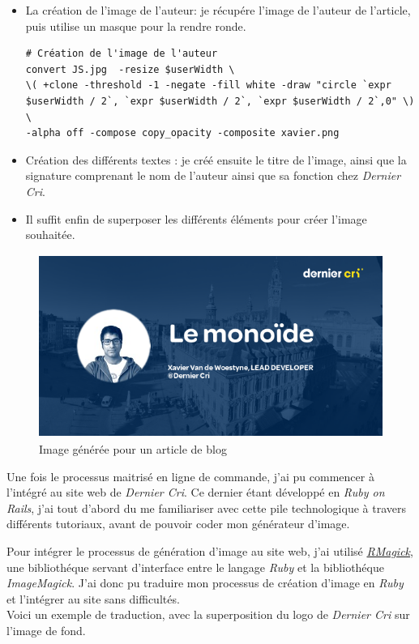 \begin{itemize}
\item
  La création de l'image de l'auteur: je récupére l'image de l'auteur de
  l'article, puis utilise un masque pour la rendre ronde.

\begin{verbatim}
# Création de l'image de l'auteur
convert JS.jpg  -resize $userWidth \
\( +clone -threshold -1 -negate -fill white -draw "circle `expr $userWidth / 2`, `expr $userWidth / 2`, `expr $userWidth / 2`,0" \) \
-alpha off -compose copy_opacity -composite xavier.png
\end{verbatim}
\item
  Création des différents textes : je créé ensuite le titre de l'image,
  ainsi que la signature comprenant le nom de l'auteur ainsi que sa
  fonction chez \emph{Dernier Cri}.
\item
  Il suffit enfin de superposer les différents éléments pour créer
  l'image souhaitée.
\end{itemize}

\begin{figure}[h]
  \centering
  \includegraphics[height=6cm]{figures/blog.png}
  \caption{Image générée pour un article de blog}
\end{figure}

\bigskip

Une fois le processus maitrisé en ligne de commande, j'ai pu commencer à
l'intégré au site web de \emph{Dernier Cri}. Ce dernier étant développé
en \emph{Ruby on Rails}, j'ai tout d'abord du me familiariser avec cette
pile technologique à travers différents tutoriaux, avant de pouvoir
coder mon générateur d'image.

\bigskip

Pour intégrer le processus de génération d'image au site web, j'ai
utilisé \href{https://github.com/rmagick/rmagick}{\emph{RMagick}}, une
bibliothéque servant d'interface entre le langage \emph{Ruby} et la
bibliothéque \emph{ImageMagick}. J'ai donc pu traduire mon processus de
création d'image en \emph{Ruby} et l'intégrer au site sans
difficultés.\\
Voici un exemple de traduction, avec la superposition du logo de
\emph{Dernier Cri} sur l'image de fond.

